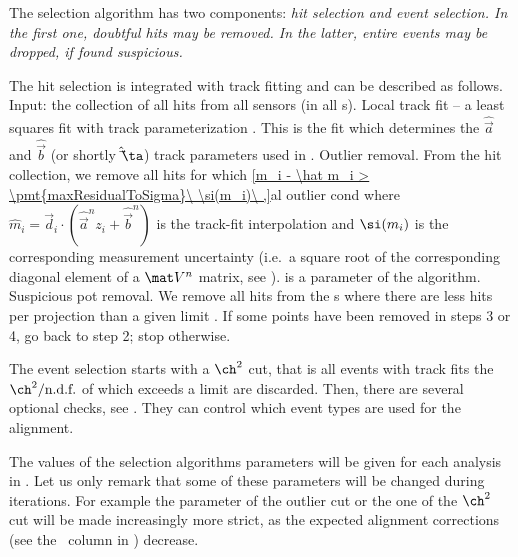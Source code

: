 The selection algorithm has two components: \em{hit selection} and \em{event selection}. In the first one, doubtful hits may be removed. In the latter, entire events may be dropped, if found suspicious.

The hit selection is integrated with track fitting and can be described as follows.
\bitm
\itm Input: the collection of all hits from all sensors (in all s).
\itm Local track fit -- a least squares fit with track parameterization . This is the fit which determines the $\hat\vec a$ and $\hat\vec b$ (or shortly $\hat\vec\ta$) track parameters used in .
\itm Outlier removal. From the hit collection, we remove all hits for which
\eqref{m_i - \hat m_i > \pmt{maxResidualToSigma}\ \si(m_i)\ ,}{al outlier cond}
where $\hat m_i = \vec d_i \cdot (\hat\vec a^n z_i + \hat\vec b^n)$ is the track-fit interpolation and $\si(m_i)$ is the corresponding measurement uncertainty (i.e.~a square root of the corresponding diagonal element of a $\mat V^n$ matrix, see ).  is a parameter of the algorithm.
\itm Suspicious pot removal. We remove all hits from the s where there are less hits per projection than a given limit .
\itm If some points have been removed in steps 3 or 4, go back to step 2; stop otherwise.
\eitm

The event selection starts with a $\ch^2$ cut, that is all events with track fits the $\ch^2/\hbox{n.d.f.}$ of which exceeds a limit  are discarded. Then, there are several optional checks, see . They can control which event types are used for the alignment.


The values of the selection algorithms parameters will be given for each analysis in . Let us only remark that some of these parameters will be changed during iterations. For example the parameter of the outlier cut  or the one of the $\ch^2$ cut will be made increasingly more strict, as the expected alignment corrections (see the \rhs~column in ) decrease.


